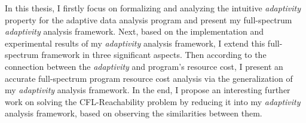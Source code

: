 \begin{abstractpage}
 In this thesis, 
 I firstly focus on formalizing and analyzing the intuitive \emph{adaptivity} property for 
 the adaptive data analysis program
 and present 
 my full-spectrum \emph{adaptivity} analysis framework.
 Next, based on the implementation and experimental results of my \emph{adaptivity} analysis framework, 
 I extend this full-spectrum framework in three significant 
aspects.
Then according to the connection between the \emph{adaptivity} and program's resource cost,
I present 
an accurate full-spectrum program resource cost analysis via
the generalization of my \emph{adaptivity} analysis framework.
In the end, 
I propose an interesting further work on solving the 
CFL-Reachability problem by reducing it into my \emph{adaptivity} analysis framework, 
based on observing the similarities between them.
 
\end{abstractpage}
